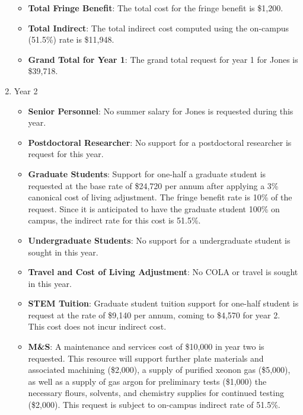\begin{enumerate}
\begin{itemize}[noitemsep,nolistsep]
\item {{\bf Total Fringe Benefit}: The total cost for the fringe benefit is \$1,200.}

\item {{\bf Total Indirect}: The total indirect cost computed using the on-campus (51.5\%) rate is \$11,948.}

\item {{\bf Grand Total for Year 1}: The grand total request for year 1 for Jones is \$39,718.}

\end{itemize}

\item{Year 2}
\begin{itemize}[noitemsep,nolistsep]

\item{{\bf Senior Personnel}: No summer salary for Jones is requested during this year.}

\item {{\bf Postdoctoral Researcher}: No support for a postdoctoral researcher is request for this year.} 

\item{{\bf Graduate Students}: Support for one-half a graduate student is requested at the base rate of \$24,720 per annum after applying a 3\% canonical cost of living adjustment.   The fringe benefit rate is 10\% of the request.  Since it is anticipated to have the graduate student 100\% on campus, the indirect rate for this cost is 51.5\%.}

\item {{\bf Undergraduate Students}: No support for a undergraduate student is sought in this year.}

\item{{\bf Travel and Cost of Living Adjustment}: No COLA or travel is sought in this year.}

\item {{\bf STEM Tuition}: Graduate student tuition support for one-half student is request at the rate of \$9,140 per annum, coming to \$4,570 for year 2.  This cost does not incur indirect cost.}

\item {{\bf M\&S}: A maintenance and services cost of \$10,000 in year two is requested. This resource will support further  plate materials and associated machining (\$2,000), a supply of purified xeonon gas (\$5,000), as well as a supply of gas argon for preliminary tests (\$1,000) the necessary flours, solvents, and chemistry supplies for continued testing (\$2,000). This request is subject to on-campus indirect rate of 51.5\%.}


\end{itemize}
\end{enumerate}
